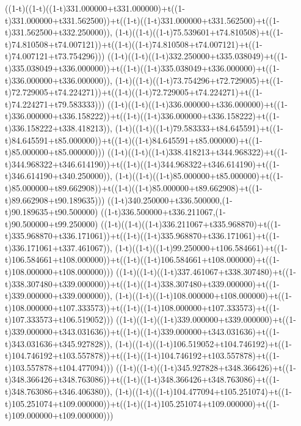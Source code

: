 ((1-t)((1-t)((1-t)331.000000+t331.000000)+t((1-t)331.000000+t331.562500))+t((1-t)((1-t)331.000000+t331.562500)+t((1-t)331.562500+t332.250000)),                                     (1-t)((1-t)((1-t)75.539601+t74.810508)+t((1-t)74.810508+t74.007121))+t((1-t)((1-t)74.810508+t74.007121)+t((1-t)74.007121+t73.754296)))
((1-t)((1-t)((1-t)332.250000+t335.038049)+t((1-t)335.038049+t336.000000))+t((1-t)((1-t)335.038049+t336.000000)+t((1-t)336.000000+t336.000000)),                                     (1-t)((1-t)((1-t)73.754296+t72.729005)+t((1-t)72.729005+t74.224271))+t((1-t)((1-t)72.729005+t74.224271)+t((1-t)74.224271+t79.583333)))
((1-t)((1-t)((1-t)336.000000+t336.000000)+t((1-t)336.000000+t336.158222))+t((1-t)((1-t)336.000000+t336.158222)+t((1-t)336.158222+t338.418213)),                                     (1-t)((1-t)((1-t)79.583333+t84.645591)+t((1-t)84.645591+t85.000000))+t((1-t)((1-t)84.645591+t85.000000)+t((1-t)85.000000+t85.000000)))
((1-t)((1-t)((1-t)338.418213+t344.968322)+t((1-t)344.968322+t346.614190))+t((1-t)((1-t)344.968322+t346.614190)+t((1-t)346.614190+t340.250000)),                                     (1-t)((1-t)((1-t)85.000000+t85.000000)+t((1-t)85.000000+t89.662908))+t((1-t)((1-t)85.000000+t89.662908)+t((1-t)89.662908+t90.189635)))
((1-t)340.250000+t336.500000,(1-t)90.189635+t90.500000)
((1-t)336.500000+t336.211067,(1-t)90.500000+t99.250000)
((1-t)((1-t)((1-t)336.211067+t335.968870)+t((1-t)335.968870+t336.171061))+t((1-t)((1-t)335.968870+t336.171061)+t((1-t)336.171061+t337.461067)),                                     (1-t)((1-t)((1-t)99.250000+t106.584661)+t((1-t)106.584661+t108.000000))+t((1-t)((1-t)106.584661+t108.000000)+t((1-t)108.000000+t108.000000)))
((1-t)((1-t)((1-t)337.461067+t338.307480)+t((1-t)338.307480+t339.000000))+t((1-t)((1-t)338.307480+t339.000000)+t((1-t)339.000000+t339.000000)),                                     (1-t)((1-t)((1-t)108.000000+t108.000000)+t((1-t)108.000000+t107.333573))+t((1-t)((1-t)108.000000+t107.333573)+t((1-t)107.333573+t106.519052)))
((1-t)((1-t)((1-t)339.000000+t339.000000)+t((1-t)339.000000+t343.031636))+t((1-t)((1-t)339.000000+t343.031636)+t((1-t)343.031636+t345.927828)),                                     (1-t)((1-t)((1-t)106.519052+t104.746192)+t((1-t)104.746192+t103.557878))+t((1-t)((1-t)104.746192+t103.557878)+t((1-t)103.557878+t104.477094)))
((1-t)((1-t)((1-t)345.927828+t348.366426)+t((1-t)348.366426+t348.763086))+t((1-t)((1-t)348.366426+t348.763086)+t((1-t)348.763086+t346.406380)),                                     (1-t)((1-t)((1-t)104.477094+t105.251074)+t((1-t)105.251074+t109.000000))+t((1-t)((1-t)105.251074+t109.000000)+t((1-t)109.000000+t109.000000)))
